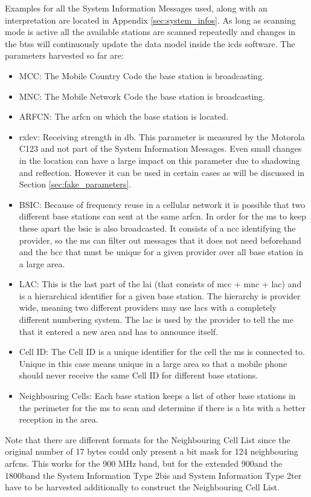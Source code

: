 Examples for all the System Information Messages used, along with an interpretation are located in Appendix \ref{sec:system_infos}.
As long as scanning mode is active all the available stations are scanned repeatedly and changes in the \glspl{bts} will continuously update the data model inside the \gls{icds} software.
The parameters harvested so far are:
\begin{itemize}
	\item MCC: The Mobile Country Code the base station is broadcasting.
	\item MNC: The Mobile Network Code the base station is broadcasting.
	\item ARFCN: The \gls{arfcn} on which the base station is located.
	\item rxlev: Receiving strength in db.
	This parameter is measured by the Motorola C123 and not part of the System Information Messages.
	Even small changes in the location can have a large impact on this parameter due to shadowing and reflection.
	However it can be used in certain cases as will be discussed in Section \ref{sec:fake_parameters}.
	\item BSIC: Because of frequency reuse in a cellular network it is possible that two different base stations can sent at the same \gls{arfcn}.
	In order for the \gls{ms} to keep these apart the \gls{bsic} is also broadcasted.
	It consists of a \gls{ncc} identifying the provider, so the \gls{ms} can filter out messages that it does not need beforehand and the \gls{bcc} that must be unique for a given provider over all base station in a large area.
	\item LAC: This is the last part of the \gls{lai} (that consists of \gls{mcc} + \gls{mnc} + \gls{lac}) and is a hierarchical identifier for a given base station.
	The hierarchy is provider wide, meaning two different providers may use \glspl{lac} with a completely different numbering system.
	The \gls{lac} is used by the provider to tell the \gls{me} that it entered a new area and has to announce itself.
	\item Cell ID: The Cell ID is a unique identifier for the cell the \gls{ms} is connected to.
	Unique in this case means unique in a large area so that a mobile phone should never receive the same Cell ID for different base stations. 
	\item Neighbouring Cells: Each base station keeps a list of other base stations in the perimeter  for the \gls{ms} to scan and determine if there is a \gls{bts} with a better reception in the area.
\end{itemize}
Note that there are different formats for the Neighbouring Cell List since the original number of 17 bytes could only present a bit mask for 124 neighbouring \glspl{arfcn}.
This works for the 900 MHz band, but for the extended 900\MHz and the 1800\MHz band the System Information Type 2bis and System Information Type 2ter have to be harvested additionally to construct the Neighbouring Cell List.

